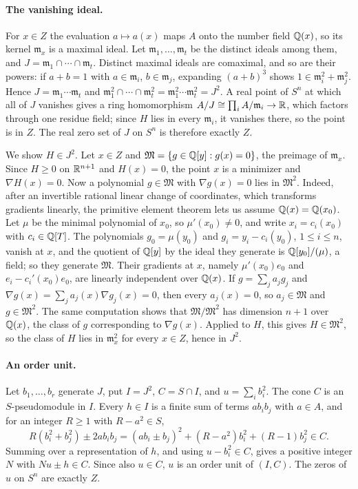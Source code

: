 \paragraph{The vanishing ideal.}
For $x\in Z$ the evaluation $a\mapsto a(x)$ maps $A$ onto the number field
$\mathbb Q(x)$, so its kernel $\mathfrak m_x$ is a maximal ideal. Let
$\mathfrak m_1,\ldots,\mathfrak m_t$ be the distinct ideals among them, and
$J=\mathfrak m_1\cap\cdots\cap\mathfrak m_t$. Distinct maximal ideals are
comaximal, and so are their powers: if $a+b=1$ with $a\in\mathfrak m_i$,
$b\in\mathfrak m_j$, expanding $(a+b)^3$ shows
$1\in\mathfrak m_i^2+\mathfrak m_j^2$. Hence
$J=\mathfrak m_1\cdots\mathfrak m_t$ and
$\mathfrak m_1^2\cap\cdots\cap\mathfrak m_t^2
=\mathfrak m_1^2\cdots\mathfrak m_t^2=J^2$. A real point of $S^n$ at which
all of $J$ vanishes gives a ring homomorphism $A/J\cong\prod_iA/\mathfrak m_i\to\mathbb R$,
which factors through one residue field; since $H$ lies in every
$\mathfrak m_i$, it vanishes there, so the point is in $Z$. The real zero set
of $J$ on $S^n$ is therefore exactly $Z$.

We show $H\in J^2$. Let $x\in Z$ and $\mathfrak M=\{g\in\mathbb Q[y]:g(x)=0\}$, the
preimage of $\mathfrak m_x$. Since $H\ge0$ on $\mathbb R^{n+1}$ and $H(x)=0$, the
point $x$ is a minimizer and $\nabla H(x)=0$. Now a polynomial
$g\in\mathfrak M$ with $\nabla g(x)=0$ lies in $\mathfrak M^2$. Indeed, after
an invertible rational linear change of coordinates, which transforms
gradients linearly, the primitive element theorem lets us assume
$\mathbb Q(x)=\mathbb Q(x_0)$. Let $\mu$ be the minimal polynomial of $x_0$, so
$\mu'(x_0)\ne0$, and write $x_i=c_i(x_0)$ with $c_i\in\mathbb Q[T]$. The polynomials
$g_0=\mu(y_0)$ and $g_i=y_i-c_i(y_0)$, $1\le i\le n$, vanish at $x$, and the
quotient of $\mathbb Q[y]$ by the ideal they generate is $\mathbb Q[y_0]/(\mu)$, a field;
so they generate $\mathfrak M$. Their gradients at $x$, namely
$\mu'(x_0)e_0$ and $e_i-c_i'(x_0)e_0$, are linearly independent over
$\mathbb Q(x)$. If $g=\sum_ja_jg_j$ and $\nabla g(x)=\sum_ja_j(x)\nabla g_j(x)=0$,
then every $a_j(x)=0$, so $a_j\in\mathfrak M$ and $g\in\mathfrak M^2$. The
same computation shows that $\mathfrak M/\mathfrak M^2$ has dimension $n+1$
over $\mathbb Q(x)$, the class of $g$ corresponding to $\nabla g(x)$. Applied to
$H$, this gives $H\in\mathfrak M^2$, so the class of $H$ lies in
$\mathfrak m_x^2$ for every $x\in Z$, hence in $J^2$.

\paragraph{An order unit.}
Let $b_1,\ldots,b_r$ generate $J$, put $I=J^2$, $C=S\cap I$, and
$u=\sum_ib_i^2$. The cone $C$ is an $S$-pseudomodule in $I$. Every $h\in I$
is a finite sum of terms $ab_ib_j$ with $a\in A$, and for an integer
$R\ge1$ with $R-a^2\in S$,
\[
 R(b_i^2+b_j^2)\pm2ab_ib_j
 =(ab_i\pm b_j)^2+(R-a^2)b_i^2+(R-1)b_j^2\in C .
\]
Summing over a representation of $h$, and using $u-b_i^2\in C$, gives a
positive integer $N$ with $Nu\pm h\in C$. Since also $u\in C$, $u$ is an
order unit of $(I,C)$. The zeros of $u$ on $S^n$
are exactly $Z$.

